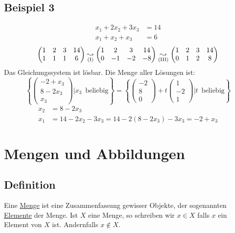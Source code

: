 \subsection{Beispiel 3}
\begin{align*}
x_1 + 2x_2 + 3x_3 &= 14 \\
x_1 + x_2 + x_3 &= 6 
\end{align*}
\[
\begin{pmatrix}
1 & 2 & 3 & 14 \\
1 & 1 & 1 & 6 
\end{pmatrix}
\underset{\text{(\RM{1})}}{\leadsto} 
\begin{pmatrix}
1 & 2 & 3 & 14 \\
0 & -1 & -2 & -8 
\end{pmatrix}
\underset{\text{(\RM{3})}}{\leadsto} 
\begin{pmatrix}
1 & 2 & 3 & 14 \\
0 & 1 & 2 & 8 
\end{pmatrix}
\]
Das Gleichungssystem ist lösbar. Die Menge aller Lösungen ist: 
\[
\left\{ \begin{pmatrix} -2+x_3 \\ 8-2x_3 \\ x_3 \end{pmatrix} \bigg|  x_3 \enspace \text{beliebig} \right\} 
=
\left\{ \begin{pmatrix} -2 \\ 8 \\ 0 \end{pmatrix} + t \begin{pmatrix} 1 \\ -2 \\ 1 \end{pmatrix} \bigg|  t \enspace \text{beliebig} \right\} 
\]
\begin{align*}
x_2 &= 8-2x_3 \\
x_1 &= 14 - 2x_2 - 3x_3 = 14 - 2(8-2x_3) -3x_3 = -2 + x_3
\end{align*}

\newpage
\setcounter{section}{0}
\section{Mengen und Abbildungen}
\subsection{Definition}
Eine \underline{Menge} ist eine Zusammenfassung gewisser Objekte, der sogenannten \underline{Elemente} der Menge. Ist \(X\) eine Menge, so schreiben wir \(x \in X\) falls \(x\) ein Element von \(X\) ist. Andernfalls \(x \not\in X\).

